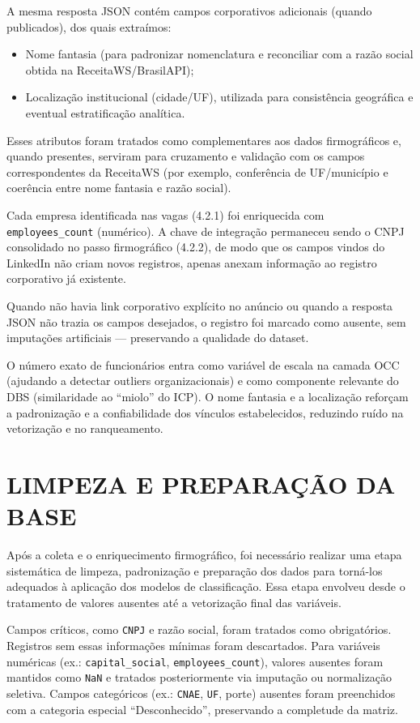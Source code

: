 A mesma resposta JSON contém campos corporativos adicionais (quando publicados), dos quais extraímos:
\begin{itemize}
    \item Nome fantasia (para padronizar nomenclatura e reconciliar com a razão social obtida na ReceitaWS/BrasilAPI);
    \item Localização institucional (cidade/UF), utilizada para consistência geográfica e eventual estratificação analítica.
\end{itemize}

Esses atributos foram tratados como complementares aos dados firmográficos e, quando presentes, serviram para cruzamento e validação com os campos correspondentes da ReceitaWS (por exemplo, conferência de UF/município e coerência entre nome fantasia e razão social).

Cada empresa identificada nas vagas (4.2.1) foi enriquecida com \texttt{employees\_count} (numérico). A chave de integração permaneceu sendo o CNPJ consolidado no passo firmográfico (4.2.2), de modo que os campos vindos do LinkedIn não criam novos registros, apenas anexam informação ao registro corporativo já existente.

Quando não havia link corporativo explícito no anúncio ou quando a resposta JSON não trazia os campos desejados, o registro foi marcado como ausente, sem imputações artificiais --- preservando a qualidade do dataset.

O número exato de funcionários entra como variável de escala na camada OCC (ajudando a detectar outliers organizacionais) e como componente relevante do DBS (similaridade ao ``miolo'' do ICP). O nome fantasia e a localização reforçam a padronização e a confiabilidade dos vínculos estabelecidos, reduzindo ruído na vetorização e no ranqueamento.

\section{LIMPEZA E PREPARAÇÃO DA BASE}

Após a coleta e o enriquecimento firmográfico, foi necessário realizar uma etapa sistemática de limpeza, padronização e preparação dos dados para torná-los adequados à aplicação dos modelos de classificação. Essa etapa envolveu desde o tratamento de valores ausentes até a vetorização final das variáveis.

Campos críticos, como \texttt{CNPJ} e razão social, foram tratados como obrigatórios. Registros sem essas informações mínimas foram descartados. Para variáveis numéricas (ex.: \texttt{capital\_social}, \texttt{employees\_count}), valores ausentes foram mantidos como \texttt{NaN} e tratados posteriormente via imputação ou normalização seletiva. Campos categóricos (ex.: \texttt{CNAE}, \texttt{UF}, porte) ausentes foram preenchidos com a categoria especial ``Desconhecido'', preservando a completude da matriz.

